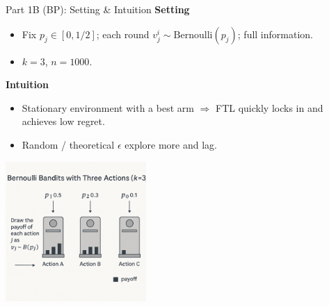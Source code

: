 \documentclass{beamer}
\begin{document}
\begin{frame}{Part 1B (BP): Setting \& Intuition}
\textbf{Setting}
\begin{itemize}
  \item Fix $p_j\in[0,1/2]$; each round $v_j^i\sim \mathrm{Bernoulli}(p_j)$; full information.
  \item $k=3$, $n=1000$.
\end{itemize}
\textbf{Intuition}
\begin{itemize}
  \item Stationary environment with a best arm $\Rightarrow$ FTL quickly locks in and achieves low regret.
  \item Random / theoretical $\epsilon$ explore more and lag.
\end{itemize}
\centering
\includegraphics[width=0.4\textwidth]{../figures/Image_B.png}
\end{frame}
\end{document}
